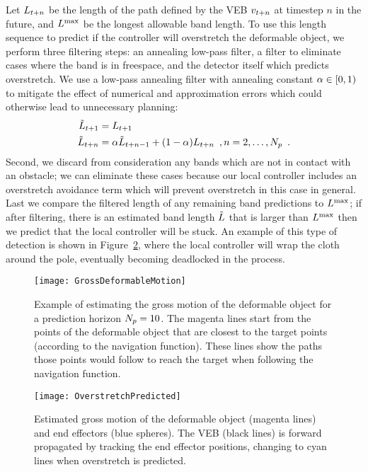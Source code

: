Let $L_{t+n}$ be the length of the path defined by the VEB $v_{t+n}$ at timestep $n$ in the future, and $L^\textrm{max}$ be the longest allowable band length. To use this length sequence to predict if the controller will overstretch the deformable object, we perform three filtering steps: an annealing low-pass filter, a filter to eliminate cases where the band is in freespace, and the detector itself which predicts overstretch. We use a low-pass annealing filter with annealing constant $\alpha \in [0, 1)$ to mitigate the effect of numerical and approximation errors which could otherwise lead to unnecessary planning:
\begin{equation}
    \begin{split}
        \tilde {L}_{t + 1} &= L_{t + 1} \\
        \tilde {L}_{t + n} &= \alpha \tilde {L}_{t + n - 1} + (1 - \alpha) L_{t + n} \enspace ,  n = 2, \dots, N_p \enspace .
    \end{split}
\end{equation}
Second, we discard from consideration any bands which are not in contact with an obstacle; we can eliminate these cases because our local controller includes an overstretch avoidance term which will prevent overstretch in this case in general. Last we compare the filtered length of any remaining band predictions to $L^\textrm{max}$; if after filtering, there is an estimated band length $\tilde {L}$ that is larger than $L^\textrm{max}$ then we predict that the local controller will be stuck. An example of this type of detection is shown in Figure~\ref{fig:overstretch_predicted}, where the local controller will wrap the cloth around the pole, eventually becoming deadlocked in the process.

\begin{figure}[h]
    \centering
    \texttt{[image: GrossDeformableMotion]}
    \caption{Example of estimating the gross motion of the deformable object for a prediction horizon $N_p = 10$. The magenta lines start from the points of the deformable object that are closest to the target points (according to the navigation function). These lines show the paths those points would follow to reach the target when following the navigation function.}
    \label{fig:gross_deformable_motion}
\end{figure}

\begin{figure}[h]
    \centering
    \texttt{[image: OverstretchPredicted]}
    \caption{Estimated gross motion of the deformable object (magenta lines) and end effectors (blue spheres). The VEB (black lines) is forward propagated by tracking the end effector positions, changing to cyan lines when overstretch is predicted.}
    \label{fig:overstretch_predicted}
\end{figure}


